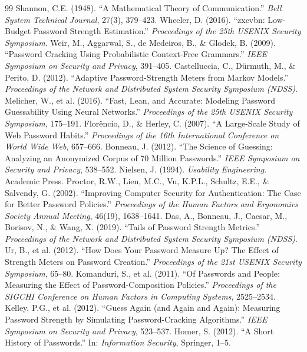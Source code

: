 \documentclass[english,12pt,twoside,a4paper]{report}
\begin{document}
\begin{thebibliography}{99}
 Shannon, C.E. (1948). ``A Mathematical Theory of Communication.'' \textit{Bell System Technical Journal}, 27(3), 379--423.
 Wheeler, D. (2016). ``zxcvbn: Low-Budget Password Strength Estimation.'' \textit{Proceedings of the 25th USENIX Security Symposium}.
 Weir, M., Aggarwal, S., de Medeiros, B., \& Glodek, B. (2009). ``Password Cracking Using Probabilistic Context-Free Grammars.'' \textit{IEEE Symposium on Security and Privacy}, 391--405.
 Castelluccia, C., D\"urmuth, M., \& Perito, D. (2012). ``Adaptive Password-Strength Meters from Markov Models.'' \textit{Proceedings of the Network and Distributed System Security Symposium (NDSS)}.
 Melicher, W., et al. (2016). ``Fast, Lean, and Accurate: Modeling Password Guessability Using Neural Networks.'' \textit{Proceedings of the 25th USENIX Security Symposium}, 175--191.
 Flor\^encio, D., \& Herley, C. (2007). ``A Large-Scale Study of Web Password Habits.'' \textit{Proceedings of the 16th International Conference on World Wide Web}, 657--666.
 Bonneau, J. (2012). ``The Science of Guessing: Analyzing an Anonymized Corpus of 70 Million Passwords.'' \textit{IEEE Symposium on Security and Privacy}, 538--552.
 Nielsen, J. (1994). \textit{Usability Engineering}. Academic Press.
 Proctor, R.W., Lien, M.C., Vu, K.P.L., Schultz, E.E., \& Salvendy, G. (2002). ``Improving Computer Security for Authentication: The Case for Better Password Policies.'' \textit{Proceedings of the Human Factors and Ergonomics Society Annual Meeting}, 46(19), 1638--1641.
 Das, A., Bonneau, J., Caesar, M., Borisov, N., \& Wang, X. (2019). ``Tails of Password Strength Metrics.'' \textit{Proceedings of the Network and Distributed System Security Symposium (NDSS)}.
 Ur, B., et al. (2012). ``How Does Your Password Measure Up? The Effect of Strength Meters on Password Creation.'' \textit{Proceedings of the 21st USENIX Security Symposium}, 65--80.
 Komanduri, S., et al. (2011). ``Of Passwords and People: Measuring the Effect of Password-Composition Policies.'' \textit{Proceedings of the SIGCHI Conference on Human Factors in Computing Systems}, 2525--2534.
 Kelley, P.G., et al. (2012). ``Guess Again (and Again and Again): Measuring Password Strength by Simulating Password-Cracking Algorithms.'' \textit{IEEE Symposium on Security and Privacy}, 523--537.
 Homer, S. (2012). ``A Short History of Passwords.'' In: \textit{Information Security}, Springer, 1--5.

\end{thebibliography}
\end{document}
